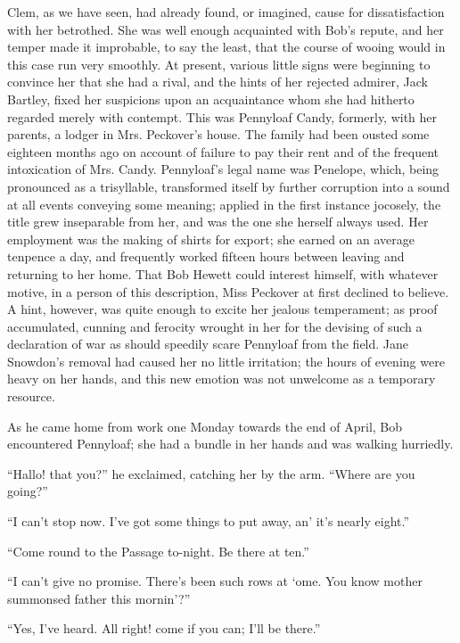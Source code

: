 Clem, as we have seen, had already found, or imagined, cause for
dissatisfaction with her betrothed. She was well enough acquainted with
Bob's repute, and her temper made it improbable, to say the least, that
the course of wooing would in this case run very smoothly. At present,
various little signs were beginning to convince her that she had a
rival, and the {\protect\hypertarget{173}{}{}}hints of her rejected
admirer, Jack Bartley, fixed her suspicions upon an acquaintance whom
she had hitherto regarded merely with contempt. This was Pennyloaf
Candy, formerly, with her parents, a lodger in Mrs. Peckover's house.
The family had been ousted some eighteen months ago on account of
failure to pay their rent and of the frequent intoxication of Mrs.
Candy. Pennyloaf's legal name was Penelope, which, being pronounced as a
trisyllable, transformed itself by further corruption into a sound at
all events conveying some meaning; applied in the first instance
jocosely, the title grew inseparable from her, and was the one she
herself always used. Her employment was the making of shirts for export;
she earned on an average tenpence a day, and frequently worked fifteen
hours between leaving and returning to her home. That Bob Hewett could
interest himself, with whatever motive, in a person of this description,
Miss Peckover at first declined to believe. A hint, however, was quite
enough to excite her jealous temperament; as proof
{\protect\hypertarget{174}{}{}}accumulated, cunning and ferocity wrought
in her for the devising of such a declaration of war as should speedily
scare Pennyloaf from the field. Jane Snowdon's removal had caused her no
little irritation; the hours of evening were heavy on her hands, and
this new emotion was not unwelcome as a temporary resource.

As he came home from work one Monday towards the end of April, Bob
encountered Pennyloaf; she had a bundle in her hands and was walking
hurriedly.

``Hallo! that you?'' he exclaimed, catching her by the arm. ``Where are
you going?''

``I can't stop now. I've got some things to put away, an' it's nearly
eight.''

``Come round to the Passage to-night. Be there at ten.''

``I can't give no promise. There's been such rows at `ome. You know
mother summonsed father this mornin'?''

``Yes, I've heard. All right! come if you can; I'll be there.''

